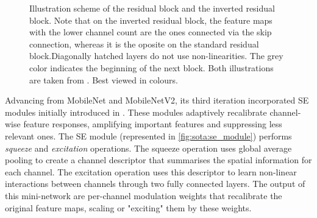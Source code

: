 \begin{figure}
    \centering
    \caption{Illustration scheme of the residual block and the inverted residual
    block. Note that on the inverted residual block, the feature maps with the lower
    channel count are the ones connected via the skip connection, whereas it is the
    oposite on the standard residual block.Diagonally hatched layers do not use
    non-linearities. The grey color indicates the beginning of the next block. Both
    illustrations are taken from \cite{DongMobileNetV2}. Best viewed in colours.}
    \label{fig:sota:inverted_vs_residual_blocks}
\end{figure}


Advancing from MobileNet and MobileNetV2, its third iteration
\cite{DBLP:conf/iccv/HowardPALSCWCTC19} incorporated \ac{SE} modules initially
introduced in \cite{DBLP:conf/cvpr/HuSS18}. These modules adaptively recalibrate
channel-wise feature responses, amplifying important features and suppressing
less relevant ones. The \ac{SE} module (represented in
\cref{fig:sota:se_module}) performs \emph{squeeze} and \emph{excitation}
operations. The squeeze operation uses global average pooling to create a
channel descriptor that summarises the spatial information for each channel. The
excitation operation uses this descriptor to learn non-linear interactions
between channels through two fully connected layers. The output of this
mini-network are per-channel modulation weights that recalibrate the original
feature maps, scaling or "exciting" them by these weights.\\

